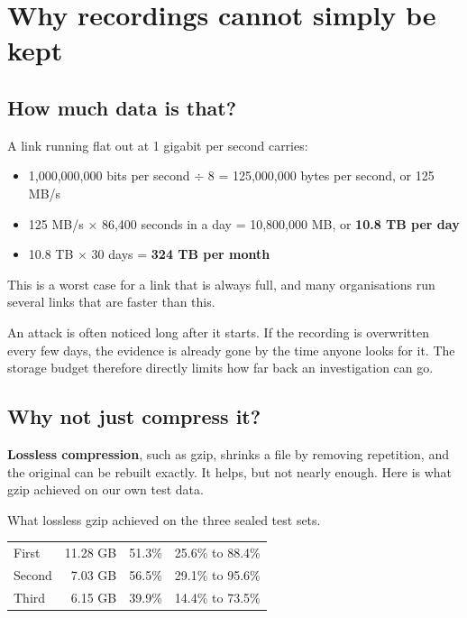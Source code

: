 
\chapter{Why recordings cannot simply be kept}

\section{How much data is that?}
\begin{example}
A link running flat out at 1 gigabit per second carries:
\begin{itemize}
\item 1,000,000,000 bits per second $\div$ 8 = 125,000,000 bytes per second, or 125 MB/s
\item 125 MB/s $\times$ 86,400 seconds in a day = 10,800,000 MB, or \textbf{10.8 TB per day}
\item 10.8 TB $\times$ 30 days = \textbf{324 TB per month}
\end{itemize}
This is a worst case for a link that is always full, and many organisations run several links that are faster than this.
\end{example}

An attack is often noticed long after it starts. If the recording is overwritten every few days, the evidence is already gone by the time anyone looks for it. The storage budget therefore directly limits how far back an investigation can go.

\section{Why not just compress it?}
\textbf{Lossless compression}, such as gzip, shrinks a file by removing repetition, and the original can be rebuilt exactly. It helps, but not nearly enough. Here is what gzip achieved on our own test data.

\begin{gtable}{What lossless gzip achieved on the three sealed test sets.}
\begin{tabularx}{\linewidth}{l r r L}
\toprule
{} &  &  & \\
\midrule
First & 11.28 GB & 51.3\% & 25.6\% to 88.4\%\\
Second & 7.03 GB & 56.5\% & 29.1\% to 95.6\%\\
Third & 6.15 GB & 39.9\% & 14.4\% to 73.5\%\\
\bottomrule
\end{tabularx}
\end{gtable}

